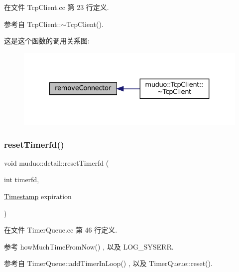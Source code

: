 在文件 Tcp\+Client.\+cc 第 23 行定义.



参考自 Tcp\+Client\+::$\sim$\+Tcp\+Client().

这是这个函数的调用关系图\+:
\nopagebreak
\begin{figure}[H]
\begin{center}
\leavevmode
\includegraphics[width=327pt]{namespacemuduo_1_1detail_ab9f5e26fda4b27382acd5a0740a83137_icgraph}
\end{center}
\end{figure}
\mbox{\label{namespacemuduo_1_1detail_a2a30bb501e8d9bb2da91ab353d1bc6fd}} 
\subsubsection{\texorpdfstring{reset\+Timerfd()}{resetTimerfd()}}
{\footnotesize\ttfamily void muduo\+::detail\+::reset\+Timerfd (\begin{DoxyParamCaption}\item[{int}]{timerfd,  }\item[{\hyperlink{classmuduo_1_1Timestamp}{Timestamp}}]{expiration }\end{DoxyParamCaption})}



在文件 Timer\+Queue.\+cc 第 46 行定义.



参考 how\+Much\+Time\+From\+Now() , 以及 L\+O\+G\+\_\+\+S\+Y\+S\+E\+RR.



参考自 Timer\+Queue\+::add\+Timer\+In\+Loop() , 以及 Timer\+Queue\+::reset().

